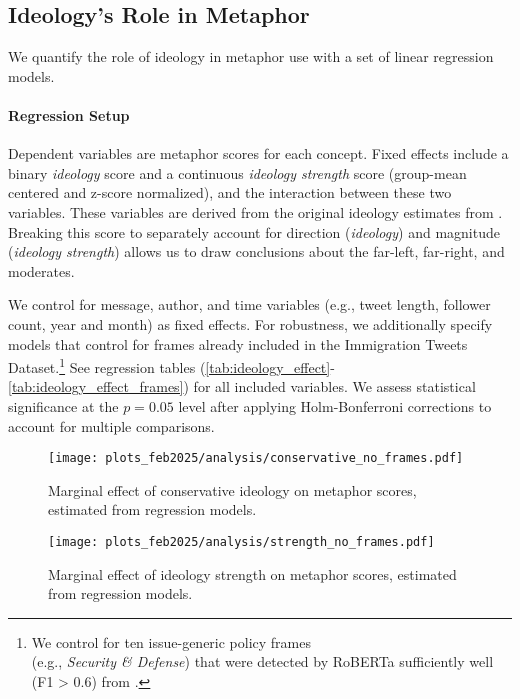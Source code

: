 \subsection{Ideology's Role in Metaphor}
\label{reg1}

We quantify the role of ideology in metaphor use with a set of linear regression models. 




\paragraph{Regression Setup} Dependent variables are metaphor scores for each concept. Fixed effects include a binary \textit{ideology} score and a continuous \textit{ideology strength} score (group-mean centered and z-score normalized), and the interaction between these two variables. These variables are derived from the original ideology estimates from \citet{mendelsohn2021modeling}. Breaking this score to separately account for direction (\textit{ideology}) and magnitude (\textit{ideology strength}) allows us to draw conclusions about the far-left, far-right, and moderates.

We control for message, author, and time variables (e.g., tweet length, follower count, year and month) as fixed effects. For robustness, we additionally specify models that control for frames already included in the Immigration Tweets Dataset.\footnote{We control for ten issue-generic policy frames\\(e.g., \textit{Security \& Defense}) that were detected by RoBERTa sufficiently well (F1 > 0.6) from \citet{mendelsohn2021modeling}.} See regression tables (\ref{tab:ideology_effect}-\ref{tab:ideology_effect_frames}) for all included variables. We assess statistical significance at the $p=0.05$ level after applying Holm-Bonferroni corrections to account for multiple comparisons.



\begin{figure}[t]
    \centering
    \texttt{[image: plots\_feb2025/analysis/conservative\_no\_frames.pdf]}
    \caption{Marginal effect of conservative ideology on metaphor scores, estimated from regression models.}
    \label{fig:ideology}
\end{figure}

\begin{figure}
    \centering
    \texttt{[image: plots\_feb2025/analysis/strength\_no\_frames.pdf]}
    \caption{Marginal effect of ideology strength on metaphor scores, estimated from regression models.}
    \label{fig:strength}
\end{figure}

